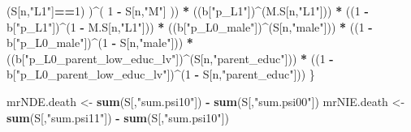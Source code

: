\documentclass[
]{book}
\newenvironment{Shaded}{\begin{snugshade}}{\end{snugshade}}
\newcommand{\DecValTok}[1]{\textcolor[rgb]{0.00,0.00,0.81}{#1}}
\newcommand{\FunctionTok}[1]{\textcolor[rgb]{0.13,0.29,0.53}{\textbf{#1}}}
\newcommand{\NormalTok}[1]{#1}
\newcommand{\OtherTok}[1]{\textcolor[rgb]{0.56,0.35,0.01}{#1}}
\newcommand{\SpecialCharTok}[1]{\textcolor[rgb]{0.81,0.36,0.00}{\textbf{#1}}}
\newcommand{\StringTok}[1]{\textcolor[rgb]{0.31,0.60,0.02}{#1}}
\begin{document}
\begin{Shaded}
\begin{Highlighting}[]
\NormalTok{          (S[n,}\StringTok{"L1"}\NormalTok{]}\SpecialCharTok{==}\DecValTok{1}\NormalTok{) )}\SpecialCharTok{\^{}}\NormalTok{( }\DecValTok{1} \SpecialCharTok{{-}}\NormalTok{ S[n,}\StringTok{"M"}\NormalTok{] )) }\SpecialCharTok{*}
\NormalTok{      ((b[}\StringTok{"p\_L1"}\NormalTok{])}\SpecialCharTok{\^{}}\NormalTok{(M.S[n,}\StringTok{"L1"}\NormalTok{])) }\SpecialCharTok{*}
\NormalTok{      ((}\DecValTok{1} \SpecialCharTok{{-}}\NormalTok{ b[}\StringTok{"p\_L1"}\NormalTok{])}\SpecialCharTok{\^{}}\NormalTok{(}\DecValTok{1} \SpecialCharTok{{-}}\NormalTok{ M.S[n,}\StringTok{"L1"}\NormalTok{])) }\SpecialCharTok{*}
\NormalTok{      ((b[}\StringTok{"p\_L0\_male"}\NormalTok{])}\SpecialCharTok{\^{}}\NormalTok{(S[n,}\StringTok{"male"}\NormalTok{])) }\SpecialCharTok{*} 
\NormalTok{      ((}\DecValTok{1} \SpecialCharTok{{-}}\NormalTok{ b[}\StringTok{"p\_L0\_male"}\NormalTok{])}\SpecialCharTok{\^{}}\NormalTok{(}\DecValTok{1} \SpecialCharTok{{-}}\NormalTok{ S[n,}\StringTok{"male"}\NormalTok{])) }\SpecialCharTok{*} 
\NormalTok{      ((b[}\StringTok{"p\_L0\_parent\_low\_educ\_lv"}\NormalTok{])}\SpecialCharTok{\^{}}\NormalTok{(S[n,}\StringTok{"parent\_educ"}\NormalTok{])) }\SpecialCharTok{*}
\NormalTok{      ((}\DecValTok{1} \SpecialCharTok{{-}}\NormalTok{ b[}\StringTok{"p\_L0\_parent\_low\_educ\_lv"}\NormalTok{])}\SpecialCharTok{\^{}}\NormalTok{(}\DecValTok{1} \SpecialCharTok{{-}}\NormalTok{ S[n,}\StringTok{"parent\_educ"}\NormalTok{])) }
\NormalTok{    \}}
  
\NormalTok{  mrNDE.death }\OtherTok{\textless{}{-}} \FunctionTok{sum}\NormalTok{(S[,}\StringTok{"sum.psi10"}\NormalTok{]) }\SpecialCharTok{{-}} \FunctionTok{sum}\NormalTok{(S[,}\StringTok{"sum.psi00"}\NormalTok{])}
\NormalTok{  mrNIE.death }\OtherTok{\textless{}{-}} \FunctionTok{sum}\NormalTok{(S[,}\StringTok{"sum.psi11"}\NormalTok{]) }\SpecialCharTok{{-}} \FunctionTok{sum}\NormalTok{(S[,}\StringTok{"sum.psi10"}\NormalTok{])}
  

\end{Highlighting}
\end{Shaded}
\end{document}
